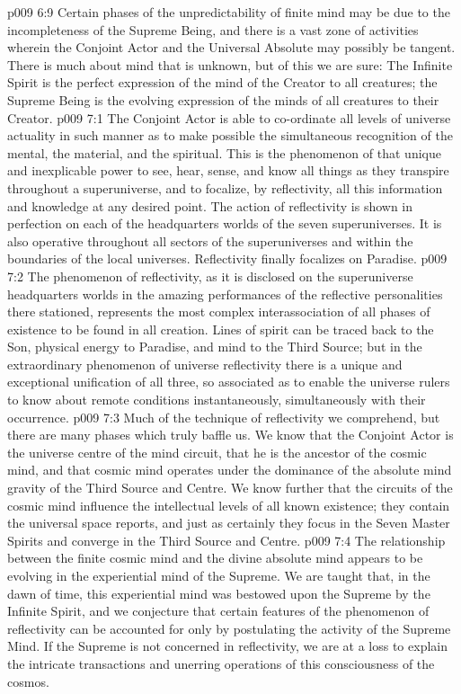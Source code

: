 \vs p009 6:9 \pc Certain phases of the unpredictability of finite mind may be due to the incompleteness of the Supreme Being, and there is a vast zone of activities wherein the Conjoint Actor and the Universal Absolute may possibly be tangent. There is much about mind that is unknown, but of this we are sure: The Infinite Spirit is the perfect expression of the mind of the Creator to all creatures; the Supreme Being is the evolving expression of the minds of all creatures to their Creator.
\vs p009 7:1 The Conjoint Actor is able to co\hyp{}ordinate all levels of universe actuality in such manner as to make possible the simultaneous recognition of the mental, the material, and the spiritual. This is the phenomenon of  that unique and inexplicable power to see, hear, sense, and know all things as they transpire throughout a superuniverse, and to focalize, by reflectivity, all this information and knowledge at any desired point. The action of reflectivity is shown in perfection on each of the headquarters worlds of the seven superuniverses. It is also operative throughout all sectors of the superuniverses and within the boundaries of the local universes. Reflectivity finally focalizes on Paradise.
\vs p009 7:2 The phenomenon of reflectivity, as it is disclosed on the superuniverse headquarters worlds in the amazing performances of the reflective personalities there stationed, represents the most complex interassociation of all phases of existence to be found in all creation. Lines of spirit can be traced back to the Son, physical energy to Paradise, and mind to the Third Source; but in the extraordinary phenomenon of universe reflectivity there is a unique and exceptional unification of all three, so associated as to enable the universe rulers to know about remote conditions instantaneously, simultaneously with their occurrence.
\vs p009 7:3 Much of the technique of reflectivity we comprehend, but there are many phases which truly baffle us. We know that the Conjoint Actor is the universe centre of the mind circuit, that he is the ancestor of the cosmic mind, and that cosmic mind operates under the dominance of the absolute mind gravity of the Third Source and Centre. We know further that the circuits of the cosmic mind influence the intellectual levels of all known existence; they contain the universal space reports, and just as certainly they focus in the Seven Master Spirits and converge in the Third Source and Centre.
\vs p009 7:4 \pc The relationship between the finite cosmic mind and the divine absolute mind appears to be evolving in the experiential mind of the Supreme. We are taught that, in the dawn of time, this experiential mind was bestowed upon the Supreme by the Infinite Spirit, and we conjecture that certain features of the phenomenon of reflectivity can be accounted for only by postulating the activity of the Supreme Mind. If the Supreme is not concerned in reflectivity, we are at a loss to explain the intricate transactions and unerring operations of this consciousness of the cosmos.
